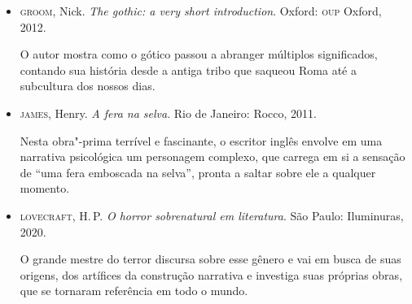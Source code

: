 \documentclass[12pt]{extarticle}
\begin{document}
\begin{itemize}
\item \textsc{groom}, Nick. \textit{The gothic: a very short introduction}. Oxford: \textsc{oup} Oxford, 2012.

O autor mostra como o gótico passou a abranger múltiplos significados,
contando sua história desde a antiga tribo que saqueou Roma até a
subcultura dos nossos dias.

\item\textsc{james}, Henry. \textit{A fera na selva}. Rio de Janeiro: Rocco, 2011.

Nesta obra"-prima terrível e fascinante, o escritor inglês envolve em uma
narrativa psicológica um personagem complexo, que carrega em si a
sensação de ``uma fera emboscada na selva'', pronta a saltar sobre ele a
qualquer momento.

\item \textsc{lovecraft}, H.\,P. \textit{O horror sobrenatural em literatura}. São Paulo: Iluminuras, 2020.

O grande mestre do terror discursa sobre esse gênero e vai em busca de
suas origens, dos artífices da construção narrativa e investiga suas
próprias obras, que se tornaram referência em todo o mundo.
\end{itemize}
\end{document}
